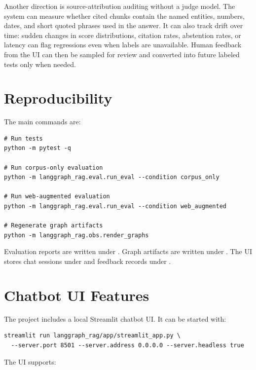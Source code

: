 \documentclass[11pt]{article}
\begin{document}
Another direction is source-attribution auditing without a judge model. The system can
measure whether cited chunks contain the named entities, numbers, dates, and short quoted
phrases used in the answer. It can also track drift over time: sudden changes in score
distributions, citation rates, abstention rates, or latency can flag regressions even when
labels are unavailable. Human feedback from the UI can then be sampled for review and
converted into future labeled tests only when needed.

\section{Reproducibility}

The main commands are:

\begin{verbatim}
# Run tests
python -m pytest -q

# Run corpus-only evaluation
python -m langgraph_rag.eval.run_eval --condition corpus_only

# Run web-augmented evaluation
python -m langgraph_rag.eval.run_eval --condition web_augmented

# Regenerate graph artifacts
python -m langgraph_rag.obs.render_graphs
\end{verbatim}

Evaluation reports are written under . Graph artifacts are written under
. The UI stores chat sessions under  and
feedback records under .

\appendix

\section{Chatbot UI Features}

The project includes a local Streamlit chatbot UI. It can be started with:

\begin{verbatim}
streamlit run langgraph_rag/app/streamlit_app.py \
  --server.port 8501 --server.address 0.0.0.0 --server.headless true
\end{verbatim}

The UI supports:
\end{document}
